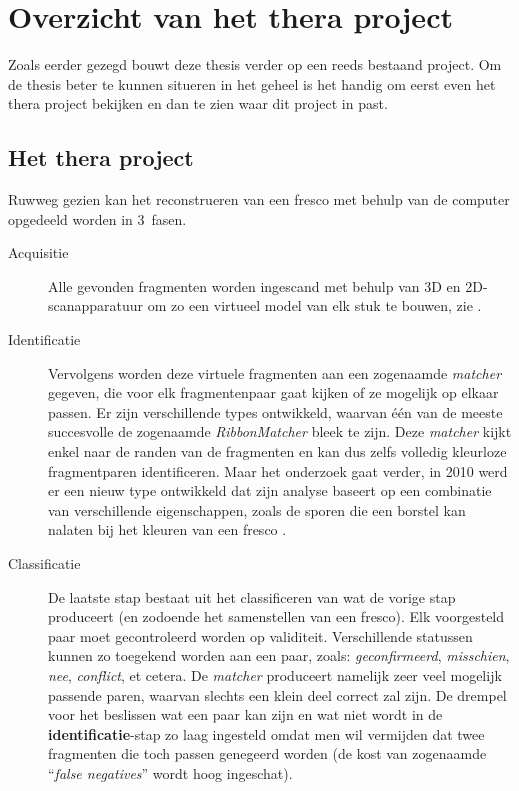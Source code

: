 \chapter{Overzicht van het thera project}
\label{hoofdstuk:overzicht}
Zoals eerder gezegd bouwt deze thesis verder op een reeds bestaand project. Om de thesis beter te kunnen situeren in het geheel is het handig om eerst even het thera project bekijken
en dan te zien waar dit project in past.

\section{Het thera project}
Ruwweg gezien kan het reconstrueren van een fresco met behulp van de computer opgedeeld worden in 3~fasen.

\begin{description}
	\item[Acquisitie] Alle gevonden fragmenten worden ingescand met behulp van 3D en 2D-scanapparatuur om zo een virtueel model van elk stuk te bouwen, zie \cite{Brown2008}.  
	\item[Identificatie] Vervolgens worden deze virtuele fragmenten aan een zogenaamde \emph{matcher} gegeven, die voor elk fragmentenpaar gaat kijken of ze mogelijk op elkaar passen. Er zijn verschillende types ontwikkeld, waarvan \'e\'en van de meeste succesvolle de zogenaamde \emph{RibbonMatcher} \cite{Brown2008} bleek te zijn. Deze \emph{matcher} kijkt enkel naar de randen van de fragmenten en kan dus zelfs volledig kleurloze fragmentparen identificeren. Maar het onderzoek gaat verder, in 2010 werd er een nieuw type ontwikkeld dat zijn analyse baseert op een combinatie van verschillende eigenschappen, zoals de sporen die een borstel kan nalaten bij het kleuren van een fresco \cite{TolerFranklin2010}.
	\item[Classificatie] De laatste stap bestaat uit het classificeren van wat de vorige stap produceert (en zodoende het samenstellen van een fresco). Elk voorgesteld paar moet gecontroleerd worden op validiteit. Verschillende statussen kunnen zo toegekend worden aan
	een paar, zoals: \emph{geconfirmeerd}, \emph{misschien}, \emph{nee}, \emph{conflict}, et cetera. De \emph{matcher} produceert namelijk zeer veel mogelijk passende paren, waarvan slechts een klein deel correct zal zijn. De drempel voor het beslissen wat een paar kan zijn en wat niet wordt in de \textbf{identificatie}-stap zo laag ingesteld omdat men wil vermijden dat twee fragmenten die toch passen genegeerd worden (de kost van zogenaamde ``\emph{false negatives}'' wordt hoog ingeschat).
\end{description}

